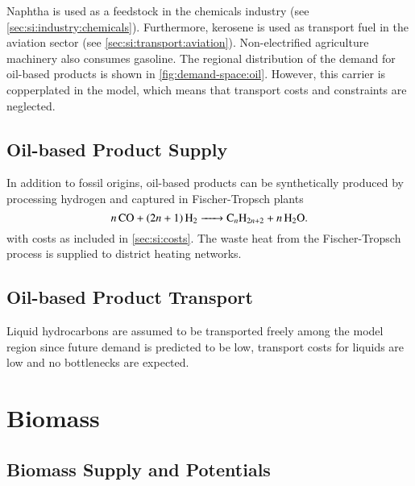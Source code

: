 Naphtha is used as a feedstock in the chemicals industry (see
\cref{sec:si:industry:chemicals}). Furthermore, kerosene is used as transport
fuel in the aviation sector (see \cref{sec:si:transport:aviation}).
Non-electrified agriculture machinery also consumes gasoline. The regional
distribution of the demand for oil-based products is shown in
\cref{fig:demand-space:oil}. However, this carrier is copperplated in the model,
which means that transport costs and constraints are neglected.

\subsection{Oil-based Product Supply}
\label{sec:si:oil:supply}

In addition to fossil origins, oil-based products can be synthetically produced
by processing hydrogen and captured \co in Fischer-Tropsch plants
\begin{equation}
    \ce{$n$CO + ($2n$ + 1)H2 -> C_$n$H_{2n+2} + $n$H2O}.
\end{equation}
with costs as included in \cref{sec:si:costs}. The waste heat from the
Fischer-Tropsch process is supplied to district heating networks.

\subsection{Oil-based Product Transport}
\label{sec:si:oil:transport}

Liquid hydrocarbons are assumed to be transported freely among the model region
since future demand is predicted to be low, transport costs for liquids are low
and no bottlenecks are expected.

\section{Biomass}
\label{sec:si:bio}



\subsection{Biomass Supply and Potentials}
\label{sec:si:bio:potentials}

